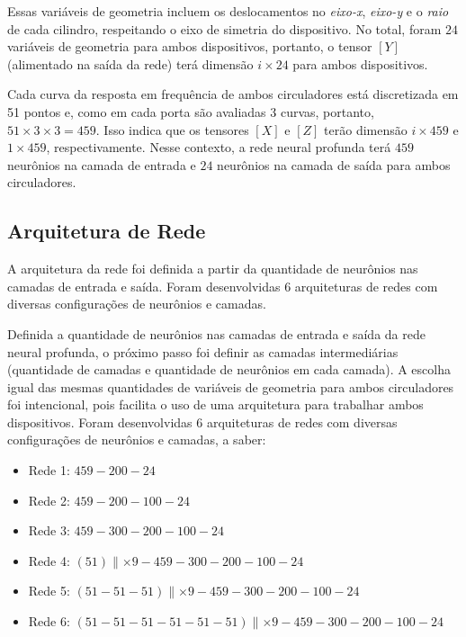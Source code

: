 Essas variáveis de geometria incluem os deslocamentos no \textit{eixo-x}, \textit{eixo-y} e o \textit{raio} de cada cilindro, respeitando o eixo de simetria do dispositivo. No total, foram $24$ variáveis de geometria para ambos dispositivos, portanto, o tensor $[Y]$ (alimentado na saída da rede) terá dimensão $i \times 24$ para ambos dispositivos.

Cada curva da resposta em frequência de ambos circuladores está discretizada em 51 pontos e, como em cada porta são avaliadas 3 curvas, portanto, $51 \times 3 \times 3 = 459$. Isso indica que os tensores $[X]$ e $[Z]$ terão dimensão $i \times 459$ e $1 \times 459$, respectivamente. Nesse contexto, a rede neural profunda terá $459$ neurônios na camada de entrada e $24$ neurônios na camada de saída para ambos circuladores.


\subsection{Arquitetura de Rede}

A arquitetura da rede foi definida a partir da quantidade de neurônios nas camadas de entrada e saída. Foram desenvolvidas 6 arquiteturas de redes com diversas configurações de neurônios e camadas.

Definida a quantidade de neurônios nas camadas de entrada e saída da rede neural profunda, o próximo passo foi definir as camadas intermediárias (quantidade de camadas e quantidade de neurônios em cada camada). A escolha igual das mesmas quantidades de variáveis de geometria para ambos circuladores foi intencional, pois facilita o uso de uma arquitetura para trabalhar ambos dispositivos. Foram desenvolvidas 6 arquiteturas de redes com diversas configurações de neurônios e camadas, a saber:

\begin{itemize}
    \item Rede 1: $459 - 200 - 24$
    \item Rede 2: $459 - 200 - 100 - 24$
    \item Rede 3: $459 - 300 - 200 - 100 - 24$
    \item Rede 4: $(51) \parallel \times 9 - 459 - 300 - 200 - 100 - 24$
    \item Rede 5: $(51 - 51 - 51) \parallel \times 9 - 459 - 300 - 200 - 100 - 24$
    \item Rede 6: $(51 - 51 - 51 - 51 - 51 - 51) \parallel \times 9 - 459 - 300 - 200 - 100 - 24$
\end{itemize}

